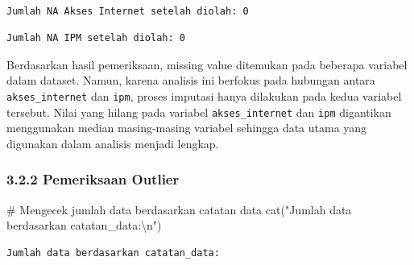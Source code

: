 \documentclass[
  indonesian,
  letterpaper,
  DIV=11,
  numbers=noendperiod]{scrartcl}
\newenvironment{Shaded}{\begin{snugshade}}{\end{snugshade}}
\newcommand{\CommentTok}[1]{\textcolor[rgb]{0.37,0.37,0.37}{#1}}
\newcommand{\FunctionTok}[1]{\textcolor[rgb]{0.28,0.35,0.67}{#1}}
\newcommand{\NormalTok}[1]{\textcolor[rgb]{0.00,0.23,0.31}{#1}}
\newcommand{\SpecialCharTok}[1]{\textcolor[rgb]{0.37,0.37,0.37}{#1}}
\newcommand{\StringTok}[1]{\textcolor[rgb]{0.13,0.47,0.30}{#1}}
\begin{document}
\begin{verbatim}

Jumlah NA Akses Internet setelah diolah: 0 
\end{verbatim}

\begin{Shaded}
\end{Shaded}

\begin{verbatim}
Jumlah NA IPM setelah diolah: 0 
\end{verbatim}

Berdasarkan hasil pemeriksaan, missing value ditemukan pada beberapa
variabel dalam dataset. Namun, karena analisis ini berfokus pada
hubungan antara \texttt{akses\_internet} dan \texttt{ipm}, proses
imputasi hanya dilakukan pada kedua variabel tersebut. Nilai yang hilang
pada variabel \texttt{akses\_internet} dan \texttt{ipm} digantikan
menggunakan median masing-masing variabel sehingga data utama yang
digunakan dalam analisis menjadi lengkap.

\subsubsection{3.2.2 Pemeriksaan Outlier}\label{pemeriksaan-outlier}

\begin{Shaded}
\begin{Highlighting}[]
\CommentTok{\# Mengecek jumlah data berdasarkan catatan data}
\FunctionTok{cat}\NormalTok{(}\StringTok{"Jumlah data berdasarkan catatan\_data:}\SpecialCharTok{\textbackslash{}n}\StringTok{"}\NormalTok{)}
\end{Highlighting}
\end{Shaded}

\begin{verbatim}
Jumlah data berdasarkan catatan_data:
\end{verbatim}

\begin{Shaded}
\end{Shaded}
\end{document}

